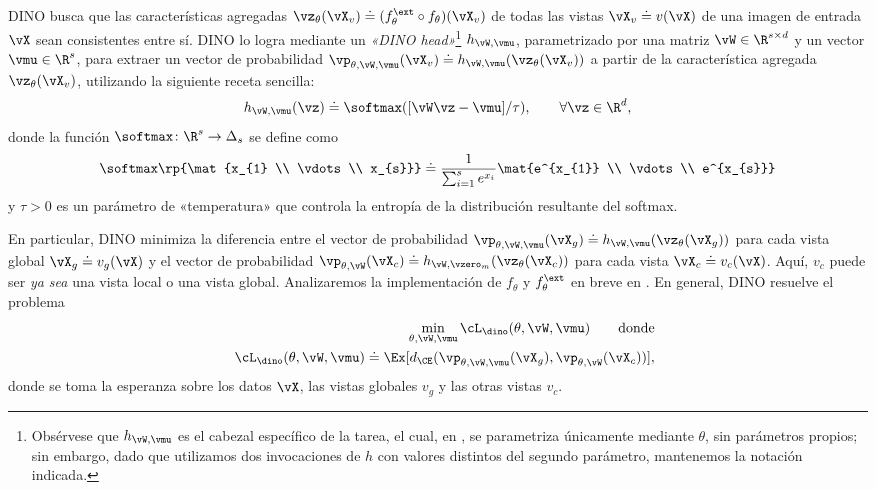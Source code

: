 \documentclass[../../book-main_es.tex]{subfiles}
\begin{document}
DINO busca que las características agregadas \(\vz_{\theta}(\vX_{v})
\doteq (f_{\theta}^{\ext} \circ f_{\theta})(\vX_{v})\) de todas las vistas
\(\vX_{v} \doteq v(\vX)\) de una imagen de entrada \(\vX\) sean consistentes
entre sí. DINO lo logra mediante un \textit{«DINO head»}\footnote{Obsérvese que \(h_{\vW, \vmu}\) es el cabezal específico de la tarea,
    el cual, en , se parametriza únicamente mediante
    \(\theta\), sin parámetros propios; sin embargo, dado que utilizamos
    dos invocaciones de \(h\) con valores distintos del segundo
parámetro, mantenemos la notación indicada.} \(h_{\vW, \vmu}\),
parametrizado por una matriz \(\vW \in \R^{s \times d}\) y un vector
\(\vmu \in \R^{s}\), para extraer un vector de probabilidad \(\vp_{\theta,
\vW, \vmu}(\vX_{v}) \doteq h_{\vW, \vmu}(\vz_{\theta}(\vX_{v}))\)
a partir de la característica agregada \(\vz_{\theta}(\vX_{v})\), utilizando la
siguiente receta sencilla:
\begin{equation}
    h_{\vW, \vmu}(\vz) \doteq \softmax([\vW\vz - \vmu]/\tau), \qquad
    \forall \vz \in \R^{d},
\end{equation}
donde la función \(\softmax \colon \R^{s} \to \Delta_{s}\) se define como
\begin{equation}
    \softmax\rp{\mat{x_{1} \\ \vdots \\ x_{s}}} \doteq
    \frac{1}{\sum_{i = 1}^{s}e^{x_{i}}}\mat{e^{x_{1}} \\ \vdots \\ e^{x_{s}}}
\end{equation}
y \(\tau > 0\) es un parámetro de «temperatura» que controla la
entropía de la distribución resultante del softmax.

En particular, DINO minimiza la diferencia entre el vector de probabilidad
\(\vp_{\theta, \vW, \vmu}(\vX_{g}) \doteq h_{\vW, 
\vmu}(\vz_{\theta}(\vX_{g}))\) para cada vista global \(\vX_{g} \doteq
v_{g}(\vX)\) y el vector de probabilidad \(\vp_{\theta, \vW}(\vX_{c})
\doteq h_{\vW, \vzero_{m}}(\vz_{\theta}(\vX_{c}))\) para cada vista
\(\vX_{c} \doteq v_{c}(\vX)\). Aquí, \(v_{c}\) puede ser
\textit{ya sea} una vista local o una vista global. Analizaremos la implementación de
\(f_{\theta}\) y \(f_{\theta}^{\ext}\) en breve en
. En general, DINO resuelve el problema
\begin{eqnarray}
    &&\min_{\theta, \vW, \vmu}\cL_{\dino}(\theta, \vW, \vmu) \qquad
    \text{donde} \nonumber \\
    &&\cL_{\dino}(\theta, \vW, \vmu) \doteq \Ex[d_{\CE}(\vp_{\theta,
    \vW, \vmu}(\vX_{g}), \vp_{\theta, \vW}(\vX_{c}))],\label{eq:dino_loss}
\end{eqnarray}
donde se toma la esperanza sobre los datos \(\vX\), las vistas globales \(v_{g}\)
y las otras vistas \(v_{c}\).
\end{document}
